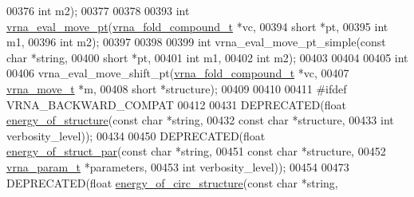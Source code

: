 \begin{DoxyCode}
00376                      \textcolor{keywordtype}{int}                  m2);
00377 
00378 
00393 \textcolor{keywordtype}{int} \hyperlink{group__eval_ga123dabc119ea98c968a5e903cc46f0fb}{vrna\_eval\_move\_pt}(\hyperlink{group__fold__compound_structvrna__fc__s}{vrna\_fold\_compound\_t}  *vc,
00394                       \textcolor{keywordtype}{short}                 *pt,
00395                       \textcolor{keywordtype}{int}                   m1,
00396                       \textcolor{keywordtype}{int}                   m2);
00397 
00398 
00399 \textcolor{keywordtype}{int} vrna\_eval\_move\_pt\_simple(\textcolor{keyword}{const} \textcolor{keywordtype}{char} *\textcolor{keywordtype}{string},
00400                              \textcolor{keywordtype}{short}      *pt,
00401                              \textcolor{keywordtype}{int}        m1,
00402                              \textcolor{keywordtype}{int}        m2);
00403 
00404 
00405 \textcolor{keywordtype}{int}
00406 vrna\_eval\_move\_shift\_pt(\hyperlink{group__fold__compound_structvrna__fc__s}{vrna\_fold\_compound\_t}  *vc,
00407                         \hyperlink{group__neighbors_structvrna__move__s}{vrna\_move\_t}           *m,
00408                         \textcolor{keywordtype}{short}                 *structure);
00409 
00410 
00411 \textcolor{preprocessor}{#ifdef VRNA\_BACKWARD\_COMPAT}
00412 
00431 DEPRECATED(\textcolor{keywordtype}{float} \hyperlink{group__eval_gaf93986cb3cb29770ec9cca69c9fab8cf}{energy\_of\_structure}(\textcolor{keyword}{const} \textcolor{keywordtype}{char} *\textcolor{keywordtype}{string},
00432                                      \textcolor{keyword}{const} \textcolor{keywordtype}{char} *structure,
00433                                      \textcolor{keywordtype}{int}        verbosity\_level));
00434 
00450 DEPRECATED(\textcolor{keywordtype}{float} \hyperlink{group__eval_gaf9d064d3c496de42eca6734a96fd2090}{energy\_of\_struct\_par}(\textcolor{keyword}{const} \textcolor{keywordtype}{char}    *\textcolor{keywordtype}{string},
00451                                       \textcolor{keyword}{const} \textcolor{keywordtype}{char}    *structure,
00452                                       \hyperlink{group__energy__parameters_structvrna__param__s}{vrna\_param\_t}  *parameters,
00453                                       \textcolor{keywordtype}{int}           verbosity\_level));
00454 
00473 DEPRECATED(\textcolor{keywordtype}{float} \hyperlink{group__eval_gaeb14f3664aec67fc03268ac75253f0f8}{energy\_of\_circ\_structure}(\textcolor{keyword}{const} \textcolor{keywordtype}{char}  *\textcolor{keywordtype}{string},

\end{DoxyCode}
